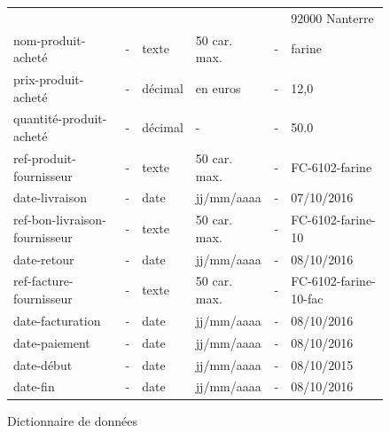\begin{figure}[!h]
\begin{tabular}{l l l l l l}
                                  &                  &         &              &              & 92000 Nanterre \\
    nom-produit-acheté            & -                & texte   & 50 car. max. & -            & farine \\
    prix-produit-acheté           & -                & décimal & en euros     & -            & 12,0 \\
    quantité-produit-acheté       & -                & décimal & -            & -            & 50.0 \\
    ref-produit-fournisseur       & -                & texte   & 50 car. max. & -            & FC-6102-farine \\
    date-livraison                & -                & date    & jj/mm/aaaa   & -            & 07/10/2016 \\
    ref-bon-livraison-fournisseur & -                & texte   & 50 car. max. & -            & FC-6102-farine-10 \\
    date-retour                   & -                & date    & jj/mm/aaaa   & -            & 08/10/2016 \\
    ref-facture-fournisseur       & -                & texte   & 50 car. max. & -            & FC-6102-farine-10-fac \\
    date-facturation              & -                & date    & jj/mm/aaaa   & -            & 08/10/2016 \\
    date-paiement                 & -                & date    & jj/mm/aaaa   & -            & 08/10/2016 \\
    date-début                    & -                & date    & jj/mm/aaaa   & -            & 08/10/2015 \\
    date-fin                      & -                & date    & jj/mm/aaaa   & -            & 08/10/2016 \\
%
\end{tabular}
    \caption{\label{DD} Dictionnaire de données}
\end{figure}

\newpage

